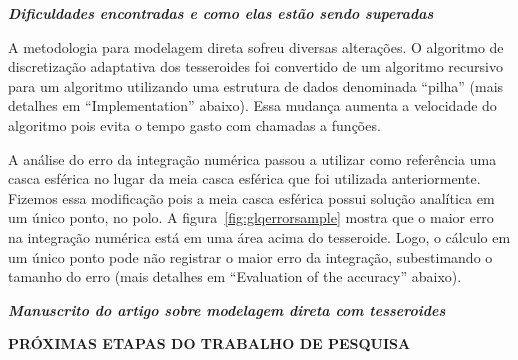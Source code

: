 \documentclass[12pt,a4paper]{article}
\begin{document}
\bigskip

{\centering\bfseries\itshape
Dificuldades encontradas e como elas estão sendo superadas
\par}

\bigskip

A metodologia para modelagem direta sofreu diversas alterações.
O algoritmo de discretização adaptativa dos tesseroides foi convertido de um
algoritmo recursivo para um algoritmo utilizando uma estrutura de dados
denominada ``pilha'' (mais detalhes em ``Implementation'' abaixo).
Essa mudança aumenta a velocidade do algoritmo pois evita o tempo gasto com
chamadas a funções.

A análise do erro da integração numérica passou a utilizar como referência uma
casca esférica no lugar da meia casca esférica que foi utilizada anteriormente.
Fizemos essa modificação pois a meia casca  esférica possui solução
analítica em um único ponto, no polo.
A figura~\ref{fig:glqerrorsample} mostra que o  maior erro na integração
numérica está em uma área acima  do tesseroide.
Logo, o cálculo em um único ponto  pode não  registrar o maior erro da
integração, subestimando o tamanho do erro
(mais detalhes em ``Evaluation of the accuracy'' abaixo).

\bigskip
\bigskip

{\centering\bfseries\itshape
Manuscrito do artigo sobre modelagem direta com tesseroides
\par}







\newpage

\begin{center}
\textbf{\large PRÓXIMAS ETAPAS DO TRABALHO DE PESQUISA}
\end{center}

\vspace{0.5cm}
\end{document}
